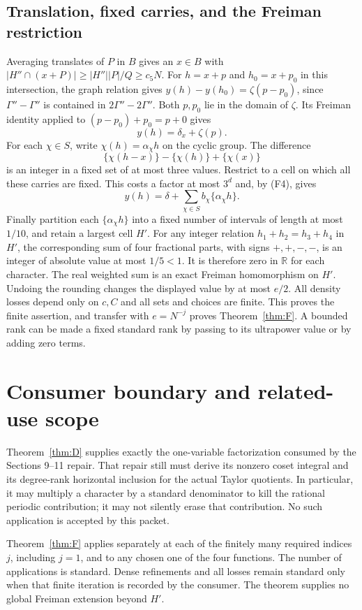 \documentclass[11pt]{article}
\newcommand{\R}{\mathbb R}
\begin{document}
\subsection*{Translation, fixed carries, and the Freiman restriction}
Averaging translates of $P$ in $B$ gives an $x\in B$ with
$|H''\cap(x+P)|\geq |H''||P|/Q\geq c_5N$.
For $h=x+p$ and $h_0=x+p_0$ in this intersection, the graph relation gives
$y(h)-y(h_0)=\zeta(p-p_0)$, since $\Gamma''-\Gamma''$ is contained in
$2\Gamma''-2\Gamma''$. Both $p,p_0$ lie in the domain of $\zeta$.
Its Freiman identity applied to $(p-p_0)+p_0=p+0$ gives
\[
                 y(h)=\delta_x+\zeta(p).
\]
For each $\chi\in S$, write $\chi(h)=\alpha_\chi h$ on the cyclic group.
The difference
\[
 \{\chi(h-x)\}-\{\chi(h)\}+\{\chi(x)\}
\]
is an integer in a fixed set of at most three values. Restrict to a cell on
which all these carries are fixed. This costs a factor at most $3^d$ and,
by (F4), gives
\[
                y(h)=\delta+\sum_{\chi\in S}b_\chi\{\alpha_\chi h\}.
\]
Finally partition each $\{\alpha_\chi h\}$ into a fixed number of intervals
of length at most $1/10$, and retain a largest cell $H'$.
For any integer relation $h_1+h_2=h_3+h_4$ in $H'$, the corresponding sum
of four fractional parts, with signs $+,+,-,-$, is an integer of absolute
value at most $1/5<1$. It is therefore zero in $\R$ for each character.
The real weighted sum is an exact Freiman homomorphism on $H'$.
Undoing the rounding changes the displayed value by at most $e/2$.
All density losses depend only on $c,C$ and all sets and choices are finite.
This proves the finite assertion, and transfer with $e=N^{-j}$ proves
Theorem~\ref{thm:F}. A bounded rank can be made a fixed standard rank by
passing to its ultrapower value or by adding zero terms.

\section{Consumer boundary and related-use scope}
Theorem~\ref{thm:D} supplies exactly the one-variable factorization consumed
by the Sections 9--11 repair. That repair still must derive its nonzero coset
integral and its degree-rank horizontal inclusion for the actual Taylor
quotients. In particular, it may multiply a character by a standard
denominator to kill the rational periodic contribution; it may not silently
erase that contribution. No such application is accepted by this packet.

Theorem~\ref{thm:F} applies separately at each of the finitely many required
indices $j$, including $j=1$, and to any chosen one of the four functions.
The number of applications is standard. Dense refinements and all losses
remain standard only when that finite iteration is recorded by the consumer.
The theorem supplies no global Freiman extension beyond $H'$.
\end{document}
